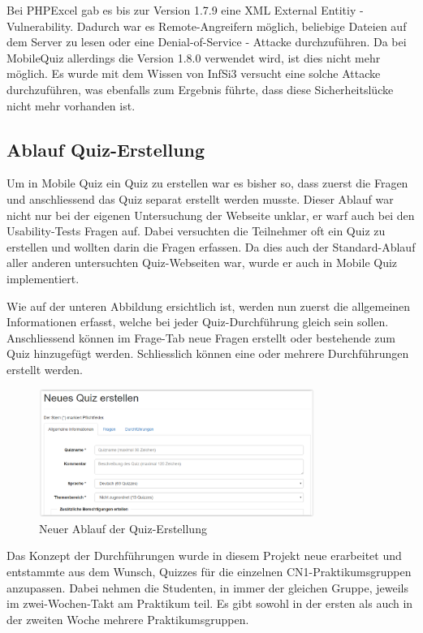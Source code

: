 Bei PHPExcel gab es bis zur Version 1.7.9 eine \gls{XML External Entitiy} - \gls{Vulnerability}. Dadurch war es Remote-Angreifern möglich, beliebige Dateien auf dem Server zu lesen oder eine Denial-of-Service - Attacke durchzuführen. \cite{cvedetails_phpexcel}
Da bei MobileQuiz allerdings die Version 1.8.0 verwendet wird, ist dies nicht mehr möglich. Es wurde mit dem Wissen von InfSi3 versucht eine solche Attacke durchzuführen, was ebenfalls zum Ergebnis führte, dass diese Sicherheitslücke nicht mehr vorhanden ist.



\subsection{Ablauf Quiz-Erstellung}
\label{subsec:quiz-erstellung}

Um in Mobile Quiz ein Quiz zu erstellen war es bisher so, dass zuerst die Fragen und anschliessend das Quiz separat erstellt werden musste. Dieser Ablauf war nicht nur bei der eigenen Untersuchung der Webseite unklar, er warf auch bei den Usability-Tests Fragen auf. Dabei versuchten die Teilnehmer oft ein Quiz zu erstellen und wollten darin die Fragen erfassen. Da dies auch der Standard-Ablauf aller anderen untersuchten Quiz-Webseiten war, wurde er auch in Mobile Quiz implementiert.

Wie auf der unteren Abbildung ersichtlich ist, werden nun zuerst die allgemeinen Informationen erfasst, welche bei jeder Quiz-Durchführung gleich sein sollen. Anschliessend können im Frage-Tab neue Fragen erstellt oder bestehende zum Quiz hinzugefügt werden. Schliesslich können eine oder mehrere Durchführungen erstellt werden.

\begin{figure}[H]
	\centering
	\includegraphics[width=0.8\textwidth]{Images/Quiz_Erstellen1.PNG}
	\caption{Neuer Ablauf der Quiz-Erstellung}
\end{figure}

Das Konzept der Durchführungen wurde in diesem Projekt neue erarbeitet und entstammte aus dem Wunsch, Quizzes für die einzelnen \acrshort{CN1}-Praktikumsgruppen anzupassen. Dabei nehmen die Studenten, in immer der gleichen Gruppe, jeweils im zwei-Wochen-Takt am Praktikum teil. Es gibt sowohl in der ersten als auch in der zweiten Woche mehrere Praktikumsgruppen.

